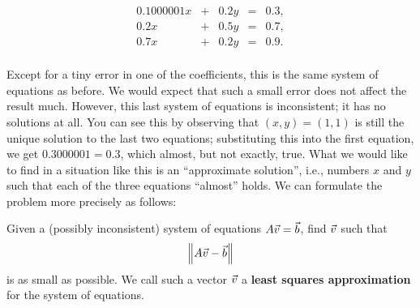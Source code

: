 \documentclass{ximera}
\begin{document}
\begin{equation*}
  \begin{array}{rcrcl}
    0.1000001 x &+& 0.2 y &=& 0.3, \\
    0.2 x &+& 0.5 y &=& 0.7, \\
    0.7 x &+& 0.2 y &=& 0.9. \\
  \end{array}
\end{equation*}

Except for a tiny error in one of the coefficients, this is the same
system of equations as before. We would expect that such a small error
does not affect the result much. However, this last system of
equations is inconsistent; it has no solutions at all. You can see
this by observing that $(x,y)=(1,1)$ is still the unique solution to
the last two equations; substituting this into the first equation, we
get $0.3000001 = 0.3$, which almost, but not exactly, true. What we
would like to find in a situation like this is an ``approximate
solution'', i.e., numbers $x$ and $y$ such that each of the three
equations ``almost'' holds. We can formulate the problem more
precisely as follows:

\begin{problem}\label{pr:least squares-approximation}

  Given a (possibly inconsistent) system of equations
  $A\vec{v}=\vec{b}$, find $\vec{v}$ such that
  \begin{equation*}
    \left\|A\vec{v} - \vec{b}\right\|
  \end{equation*}
  is as small as possible. We call such a vector $\vec{v}$ a
  \textbf{least squares approximation}%
   for the system of equations.
\end{problem}
\end{document}
